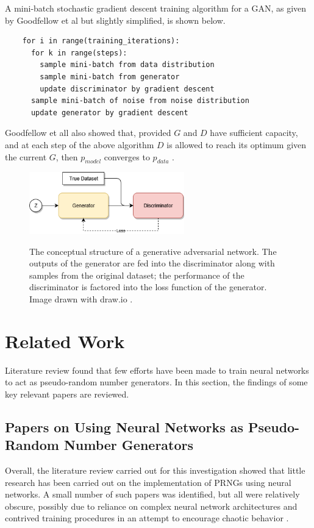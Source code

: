 \documentclass[12pt, titlepage]{report}
\theoremstyle{definition}
\begin{document}
A mini-batch stochastic gradient descent training algorithm for a GAN, as given by Goodfellow et al but slightly simplified, is shown below.
\begin{verbatim}
    for i in range(training_iterations):
      for k in range(steps):
        sample mini-batch from data distribution
        sample mini-batch from generator
        update discriminator by gradient descent
      sample mini-batch of noise from noise distribution
      update generator by gradient descent
\end{verbatim}
Goodfellow et all also showed that, provided $G$ and $D$ have sufficient capacity, and at each step of the above algorithm $D$ is allowed to reach its optimum given the current $G$, then $p_{model}$ converges to $p_{data}$ \cite[p. 5]{goodfellow2014generative}.

\begin{figure}
    \centering
    \includegraphics[width=0.6\textwidth]{img/gan.png}\\
    \caption{The conceptual structure of a generative adversarial network. The outputs of the generator are fed into the discriminator along with samples from the original dataset; the performance of the discriminator is factored into the loss function of the generator. Image drawn with draw.io \cite{jgraph2018draw}.}
    \label{figure:gan}
\end{figure}



\section{Related Work}\label{section:related_work}
Literature review found that few efforts have been made to train neural networks to act as pseudo-random number generators. In this section, the findings of some key relevant papers are reviewed.



\subsection{Papers on Using Neural Networks as Pseudo-Random Number Generators}
Overall, the literature review carried out for this investigation showed that little research has been carried out on the implementation of PRNGs using neural networks. A small number of such papers was identified, but all were relatively obscure, possibly due to reliance on complex neural network architectures and contrived training procedures in an attempt to encourage chaotic behavior \cite{desai2011pseudo} \cite{desai2012pseudo} \cite{tirdad2010hopfield}.
\end{document}
